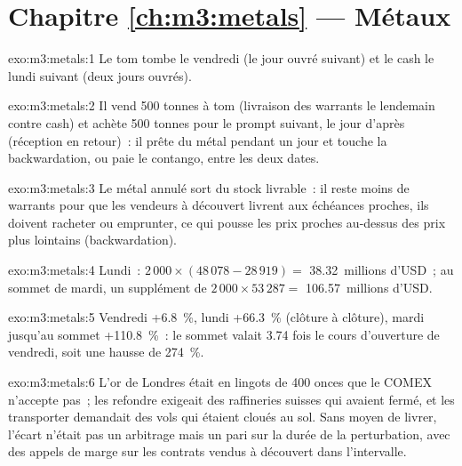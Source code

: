 \section*{Chapitre \ref{ch:m3:metals} --- Métaux}

\begin{solution}{exo:m3:metals:1}
Le tom tombe le vendredi (le jour ouvré suivant) et le cash le lundi suivant (deux jours ouvrés).
\end{solution}

\begin{solution}{exo:m3:metals:2}
Il vend 500 tonnes à tom (livraison des warrants le lendemain contre cash) et achète 500 tonnes pour le
prompt suivant, le jour d'après (réception en retour)~: il prête du métal pendant un jour et touche la
backwardation, ou paie le contango, entre les deux dates.
\end{solution}

\begin{solution}{exo:m3:metals:3}
Le métal annulé sort du stock livrable~: il reste moins de warrants pour que les vendeurs à découvert livrent aux
échéances proches, ils doivent racheter ou emprunter, ce qui pousse les prix proches au-dessus des prix plus lointains (backwardation).
\end{solution}

\begin{solution}{exo:m3:metals:4}
Lundi~: $2\,000 \times (48\,078 - 28\,919) = $ 38.32~millions d'USD~; au sommet de mardi, un supplément de $2\,000
\times 53\,287 = $ 106.57~millions d'USD.
\end{solution}

\begin{solution}{exo:m3:metals:5}
Vendredi +6.8~\%, lundi +66.3~\% (clôture à clôture), mardi jusqu'au sommet +110.8~\%~: le sommet valait 3.74 fois
le cours d'ouverture de vendredi, soit une hausse de 274~\%.
\end{solution}

\begin{solution}{exo:m3:metals:6}
L'or de Londres était en lingots de 400 onces que le COMEX n'accepte pas~; les refondre exigeait des
raffineries suisses qui avaient fermé, et les transporter demandait des vols qui étaient cloués au sol. Sans
moyen de livrer, l'écart n'était pas un arbitrage mais un pari sur la durée de la perturbation, avec des
appels de marge sur les contrats vendus à découvert dans l'intervalle.
\end{solution}


